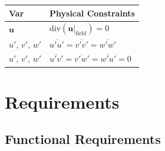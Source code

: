 \documentclass[12pt]{article}
\begin{document}
\begin{table}[!h]
\caption{Output Variables} \label{TblOutputVar}
\renewcommand{\arraystretch}{1.2}
\noindent \begin{longtable*}{l l} 
  \toprule
  \textbf{Var} & \textbf{Physical Constraints} \\
  \midrule 
  $\textbf{u}$ & $\text{div}(\mathbf{u}|_\text{field}) = 0$
  \\
  $u'$, $v'$, $w'$ & $\overline{u'u'} = \overline{v'v'} = \overline{w'w'}$
  \\
  $u'$, $v'$, $w'$ & $\overline{u'v'} = \overline{v'w'} = \overline{w'u'} = 0$
  \\
  \bottomrule
\end{longtable*}
\end{table}


\section{Requirements} \label{Sec_req}



\subsection{Functional Requirements}
\end{document}
